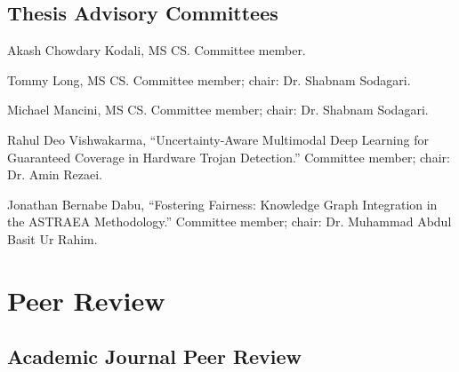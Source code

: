 \documentclass[11pt,letterpaper]{report}
\newcommand{\listitemspace}{0.25em}
\renewenvironment{itemize}
{\begin{list}{}{\setlength{\leftmargin}{0em}
                \setlength{\parskip}{0em}
                \setlength{\itemsep}{\listitemspace}
                \setlength{\parsep}{\listitemspace}}}
{\end{list}}
\begin{document}
    \subsection*{Thesis Advisory Committees}

    \begin{tablist}
        \item[2026] \tab{} Akash Chowdary Kodali, MS CS. Committee member.
        \item[2026] \tab{} Tommy Long, MS CS. Committee member; chair: Dr. Shabnam Sodagari.
        \item[2026] \tab{} Michael Mancini, MS CS. Committee member; chair: Dr. Shabnam Sodagari.
        \item[2024] \tab{} Rahul Deo Vishwakarma, \enquote{Uncertainty-Aware Multimodal Deep Learning for Guaranteed Coverage in Hardware Trojan Detection.} Committee member; chair: Dr. Amin Rezaei.
        \item[2024] \tab{} Jonathan Bernabe Dabu, \enquote{Fostering Fairness: Knowledge Graph Integration in the ASTRAEA Methodology.} Committee member; chair: Dr. Muhammad Abdul Basit Ur Rahim.
    \end{tablist}







    \section*{Peer Review}

    \subsection*{Academic Journal Peer Review}
\end{document}
